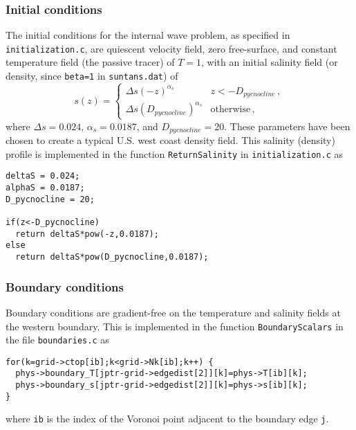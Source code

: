 \subsubsection{Initial conditions}

The initial conditions for the internal wave problem, as specified in \verb+initialization.c+,
are quiescent velocity field, zero free-surface, and constant temperature field (the passive
tracer) of $T=1$, with an initial salinity field (or density, since
\verb+beta=1+ in \verb+suntans.dat+) of
\[
s(z) = \left\{\begin{array}{ll}
\Delta s\left(-z\right)^{\alpha_s} & z<-D_{pycnocline}\,,\\
\Delta s\left(D_{pycnocline}\right)^{\alpha_s} & \mbox{otherwise}\,,
\end{array}\right.
\]
where $\Delta s = 0.024$, $\alpha_s = 0.0187$, and $D_{pycnocline} = 20$.  These
parameters have been chosen to create a typical U.S. west coast density field.
This salinity (density) profile is 
implemented in the function \verb+ReturnSalinity+ in \verb+initialization.c+ as
\begin{verbatim}
deltaS = 0.024;
alphaS = 0.0187;
D_pycnocline = 20;

if(z<-D_pycnocline)
  return deltaS*pow(-z,0.0187);
else
  return deltaS*pow(D_pycnocline,0.0187);
\end{verbatim}

\subsubsection{Boundary conditions}

Boundary conditions are gradient-free on the temperature and salinity fields at the western
boundary.  This is implemented in the function \verb+BoundaryScalars+ in the file \verb+boundaries.c+
as
\begin{verbatim}
for(k=grid->ctop[ib];k<grid->Nk[ib];k++) {
  phys->boundary_T[jptr-grid->edgedist[2]][k]=phys->T[ib][k];
  phys->boundary_s[jptr-grid->edgedist[2]][k]=phys->s[ib][k];
}
\end{verbatim}
where \verb+ib+ is the index of the Voronoi point adjacent to the boundary edge \verb+j+.

